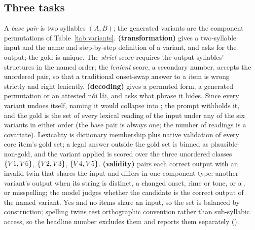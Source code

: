 \subsection{Three tasks}
\label{sec:tasks}
A \emph{base pair} is two syllables $(A, B)$; the generated variants are the component permutations of Table~\ref{tab:variants}. \textbf{ (transformation)} gives a two-syllable input and the name and step-by-step definition of a variant, and asks for the output; the gold is unique. The \emph{strict} score requires the output syllables' structures in the named order; the \emph{lenient} score, a secondary number, accepts the unordered pair, so that a traditional onset-swap answer to a  item is wrong strictly and right leniently. \textbf{ (decoding)} gives a permuted form, a generated permutation or an attested nói lái, and asks what phrase it hides. Since every variant undoes itself, naming it would collapse  into ; the prompt withholds it, and the gold is the set of every lexical reading of the input under any of the six variants in either order (the base pair is always one; the number of readings is a covariate). Lexicality is dictionary membership plus native validation of every core item's gold set; a legal answer outside the gold set is binned as plausible-non-gold, and the variant applied is scored over the three unordered classes $\{V1,V6\}$, $\{V2,V3\}$, $\{V4,V5\}$. \textbf{ (validity)} pairs each correct  output with an invalid twin that shares the input and differs in one component type: another variant's output when its string is distinct, a changed onset, rime or tone, or a ,  or  misspelling; the model judges whether the candidate is the correct output of the named variant. Yes and no items share an input, so the set is balanced by construction; spelling twins test orthographic convention rather than sub-syllabic access, so the headline  number excludes them and reports them separately ().

